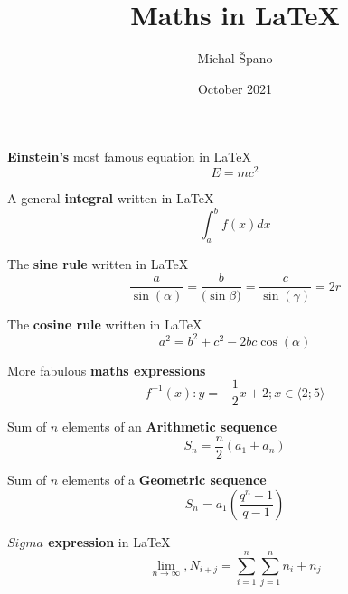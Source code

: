 \documentclass{article}
\title{Maths in \LaTeX{}}
\author{Michal Špano}
\date{October 2021}
\begin{document}
\maketitle

\textbf{Einstein's} most famous equation in \LaTeX{}
\[ E=mc^2\]

A general \textbf{integral} written in \LaTeX{}
\[ \int_a^b f(x)dx\]

The \textbf{sine rule} written in \LaTeX{}
\[ \frac{a}{\sin{(\alpha)}}=\frac{b}{(\sin{\beta)}}=\frac{c}{\sin{(\gamma)}}=2r \]

The \textbf{cosine rule} written in \LaTeX{}
\[ a^2=b^2+c^2-2bc\cos{(\alpha)}\]

More fabulous \textbf{maths expressions}
\[ f^{-1}(x): y=-\frac{1}{2}x+2; x\in \langle 2;5 \rangle\]

Sum of $n$ elements of an \textbf{Arithmetic sequence}
\[ S_n=\frac{n}{2}(a_1 + a_n)\]

Sum of $n$ elements of a \textbf{Geometric sequence}
\[S_n=a_1(\frac{q^n-1}{q-1})\]

\textbf{$Sigma$ expression} in \LaTeX{}
\[ 
\lim_{n\to\infty}, N_{i+j} = \sum^{n}_{i=1} \sum^{n}_{j=1} n_i+n_j
\]
\end{document}
